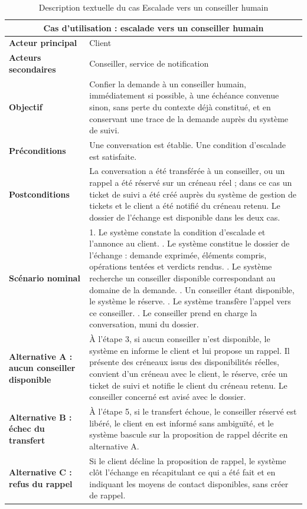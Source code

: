 \begin{table}[H]
\centering
\renewcommand{\arraystretch}{1.25}
\begin{tabular}{|p{3.0cm}|p{11.5cm}|}
\hline
\multicolumn{2}{|c|}{\textbf{Cas d'utilisation : escalade vers un conseiller humain}} \\
\hline
\textbf{Acteur principal} & Client \\
\hline
\textbf{Acteurs secondaires} & Conseiller, service de notification \\
\hline
\textbf{Objectif} & Confier la demande à un conseiller humain, immédiatement si possible, à une échéance convenue sinon, sans perte du contexte déjà constitué, et en conservant une trace de la demande auprès du système de suivi. \\
\hline
\textbf{Préconditions} & Une conversation est établie. Une condition d'escalade est satisfaite. \\
\hline
\textbf{Postconditions} & La conversation a été transférée à un conseiller, ou un rappel a été réservé sur un créneau réel ; dans ce cas un ticket de suivi a été créé auprès du système de gestion de tickets et le client a été notifié du créneau retenu. Le dossier de l'échange est disponible dans les deux cas. \\
\hline
\textbf{Scénario nominal} &
1. Le système constate la condition d'escalade et l'annonce au client. \newline
2. Le système constitue le dossier de l'échange : demande exprimée, éléments compris, opérations tentées et verdicts rendus. \newline
3. Le système recherche un conseiller disponible correspondant au domaine de la demande. \newline
4. Un conseiller étant disponible, le système le réserve. \newline
5. Le système transfère l'appel vers ce conseiller. \newline
6. Le conseiller prend en charge la conversation, muni du dossier. \\
\hline
\textbf{Alternative A : aucun conseiller disponible} & À l'étape 3, si aucun conseiller n'est disponible, le système en informe le client et lui propose un rappel. Il présente des créneaux issus des disponibilités réelles, convient d'un créneau avec le client, le réserve, crée un ticket de suivi et notifie le client du créneau retenu. Le conseiller concerné est avisé avec le dossier. \\
\hline
\textbf{Alternative B : échec du transfert} & À l'étape 5, si le transfert échoue, le conseiller réservé est libéré, le client en est informé sans ambiguïté, et le système bascule sur la proposition de rappel décrite en alternative A. \\
\hline
\textbf{Alternative C : refus du rappel} & Si le client décline la proposition de rappel, le système clôt l'échange en récapitulant ce qui a été fait et en indiquant les moyens de contact disponibles, sans créer de rappel. \\
\hline
\end{tabular}
\caption{Description textuelle du cas Escalade vers un conseiller humain}
\label{tab:cu-escalade}
\end{table}

